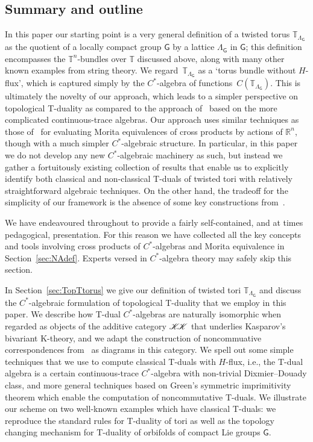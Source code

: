\documentclass[10pt,a4paper]{amsart}
\numberwithin{equation}{section}
\newcommand{\CCK}{\mathscr{K}}
\newcommand{\sfG}{\mathsf{G}}
\newcommand{\R}{\real}
\newcommand{\real}{{\mathbb R}} %
\newcommand{\torus}{{\mathbb T}} %
\begin{document}
\subsection{Summary and outline}

In this paper our starting point is a very general definition of a
twisted torus $\torus_{\Lambda_\sfG}$ as the quotient of a locally
compact group $\sfG$ by a lattice $\Lambda_\sfG$ in $\sfG$; this definition
encompasses the $\torus^n$-bundles over $\torus$ discussed above,
along with many other known examples from string theory. We regard~$\torus_{\Lambda_\sfG}$ as a `torus bundle without $H$-flux', which is
captured simply by the $C^*$-algebra of functions~$C(\torus_{\Lambda_\sfG})$. This is ultimately the novelty of our
approach, which leads to a simpler perspective on topological
T-duality as compared to the approach of~\cite{Mathai2004,Mathai2005}
based on the more complicated continuous-trace algebras. Our approach
uses similar techniques as those of~\cite{Mathai2004,Mathai2005} for
evaluating Morita equivalences of cross products by actions of $\R^n$,
though with a much simpler $C^*$-algebraic structure. In particular,
in this paper we do not develop any new $C^*$-algebraic machinery as such, but instead
we gather a fortuitously existing collection of results that enable us
to explicitly identify both classical and non-classical T-duals of
twisted tori with relatively straightforward algebraic techniques. On
the other hand, the tradeoff for the simplicity of our framework is
the absence of some key constructions
from~\cite{Bouwknegt2008, Mathai2004,Mathai2005}.

We have endeavoured throughout to provide a fairly self-contained, and at times
pedagogical, presentation. For this reason we have collected all the
key concepts and tools involving cross products of $C^*$-algebras and
Morita equivalence in Section~\ref{sec:NAdef}. Experts versed in
$C^*$-algebra theory may safely skip this section.

In Section~\ref{sec:TopTtorus} we give our definition of twisted tori
$\torus_{\Lambda_\sfG}$ and discuss the $C^*$-algebraic formulation of topological
T-duality that we employ in this paper. We describe how T-dual
$C^*$-algebras are naturally isomorphic when regarded as objects of
the additive category $\CCK\hspace{-1mm}\CCK$ that underlies
Kasparov's bivariant K-theory, and we adapt the construction of
noncommuative correspondences from~\cite{Brodzki2007} as diagrams in
this category. We spell out some simple techniques that we use to
compute classical T-duals with $H$-flux, i.e., the T-dual algebra is a
certain continuous-trace $C^*$-algebra with non-trivial
Dixmier--Douady class, and more general techniques based on Green's
symmetric imprimitivity
theorem which enable the computation of noncommutative T-duals. We
illustrate our scheme on two well-known examples which have classical
T-duals: we reproduce the standard rules for T-duality of tori as well
as the topology changing mechanism for T-duality of orbifolds of
compact Lie groups $\sfG$.
\end{document}
